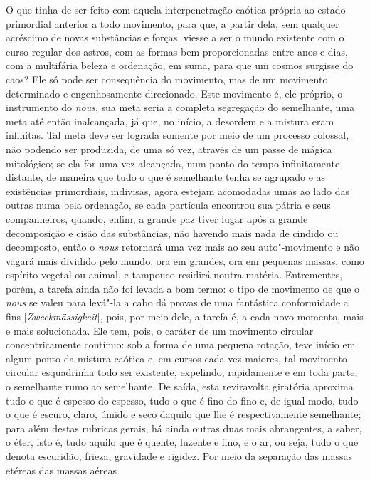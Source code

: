O que tinha de ser feito com aquela interpenetração caótica própria ao
estado primordial anterior a todo movimento, para que, a partir dela,
sem qualquer acréscimo de novas substâncias e forças, viesse a ser o
mundo existente com o curso regular dos astros, com as formas bem
proporcionadas entre anos e dias, com a multifária beleza e ordenação,
em suma, para que um cosmos surgisse do caos? Ele só pode ser
consequência do movimento, mas de um movimento determinado e
engenhosamente direcionado. Este movimento é, ele próprio, o instrumento
do \textit{nous}, sua meta seria a completa segregação do
semelhante, uma meta até então inalcançada, já que, no início, a
desordem e a mistura eram infinitas. Tal meta deve ser lograda somente
por meio de um processo colossal, não podendo ser produzida, de uma só
vez, através de um passe de mágica mitológico; se ela for uma vez
alcançada, num ponto do tempo infinitamente distante, de maneira que tudo
o que é semelhante tenha se agrupado e as existências primordiais,
indivisas, agora estejam acomodadas umas ao lado das outras numa bela
ordenação, se cada partícula encontrou sua pátria e seus companheiros,
quando, enfim, a grande paz tiver lugar após a grande decomposição e
cisão das substâncias, não havendo mais nada de cindido ou decomposto,
então o \textit{nous} retornará uma vez mais ao seu auto"-movimento e
não vagará mais dividido pelo mundo, ora em grandes, ora em pequenas
massas, como espírito vegetal ou animal, e tampouco residirá noutra
matéria. Entrementes, porém, a tarefa ainda não foi levada a bom termo:
o tipo de movimento de que o \textit{nous} se valeu para levá"-la a cabo
dá provas de uma fantástica conformidade a fins
[\textit{Zweckmässigkeit}], pois, por meio dele, a tarefa é, a cada 
novo momento, mais e mais solucionada. Ele tem, pois, o caráter de um
movimento circular concentricamente contínuo: sob a forma de uma
pequena rotação, teve início em algum ponto da mistura caótica e, em
cursos cada vez maiores, tal movimento circular esquadrinha todo ser
existente, expelindo, rapidamente e em toda parte, o semelhante rumo ao
semelhante. De saída, esta reviravolta giratória aproxima tudo o que é
espesso do espesso, tudo o que é fino do fino e, de igual modo, tudo o
que é escuro, claro, úmido e seco daquilo que lhe é respectivamente
semelhante; para além destas rubricas gerais, há ainda outras duas mais
abrangentes, a saber, o éter, isto é, tudo aquilo que é quente, luzente
e fino, e o ar, ou seja, tudo o que denota escuridão, frieza, gravidade
e rigidez. Por meio da separação das massas etéreas das massas aéreas
